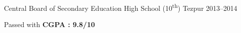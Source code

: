 \begin{cventries}
  \cventry
    {Central Board of Secondary Education} %
    {High School (10\textsuperscript{th})} %
    {Tezpur} %
    {2013--2014} %
    {
      \begin{cvitems} %
        \item {Passed with \textbf{CGPA : 9.8/10}}
      \end{cvitems}
    }
    {}

\end{cventries}

